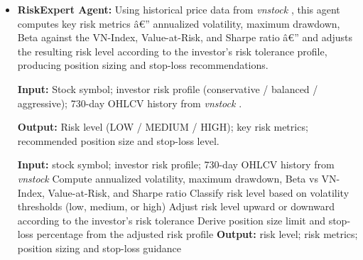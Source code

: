 \documentclass{ieeeaccess}
\begin{document}
\begin{itemize}
    \textbf{Input:} Stock symbol; financial ratios (P/E, P/B, EPS, dividend yield) and 730-day
    OHLCV data from \textit{vnstock} \cite{vnstock2023}.

    \textbf{Output:} Investment recommendation (BUY/HOLD/SELL); composite score (0--100);
    confidence level; per-dimension analysis breakdown.

    \begin{algorithmic}[1]
    \STATE \textbf{Input:} stock symbol; financial ratios and OHLCV history from \textit{vnstock}
    \STATE Fetch P/E, P/B, EPS, dividend yield, 52-week high/low, volume, and Beta
    \STATE Score each metric independently on a 0--100 scale based on predefined thresholds
    \STATE Combine scores with higher priority on financial health, followed equally by technical position and valuation
    \STATE Map composite score to recommendation: high scores yield BUY, low scores yield SELL, mid-range yields HOLD
    \STATE \textbf{Output:} recommendation; composite score; confidence level
    \end{algorithmic}


    \item \textbf{RiskExpert Agent:}
    Using historical price data from \textit{vnstock} \cite{vnstock2023}, this agent computes
    key risk metrics â€” annualized volatility, maximum drawdown, Beta against the VN-Index,
    Value-at-Risk, and Sharpe ratio â€” and adjusts the resulting risk level according to the
    investor's risk tolerance profile, producing position sizing and stop-loss recommendations.
    
    \textbf{Input:} Stock symbol; investor risk profile (conservative / balanced / aggressive);
    730-day OHLCV history from \textit{vnstock} \cite{vnstock2023}.

    \textbf{Output:} Risk level (LOW / MEDIUM / HIGH); key risk metrics; recommended position
    size and stop-loss level.

    \begin{algorithmic}[1]
    \STATE \textbf{Input:} stock symbol; investor risk profile; 730-day OHLCV history from \textit{vnstock}
    \STATE Compute annualized volatility, maximum drawdown, Beta vs VN-Index, Value-at-Risk, and Sharpe ratio
    \STATE Classify risk level based on volatility thresholds (low, medium, or high)
    \STATE Adjust risk level upward or downward according to the investor's risk tolerance
    \STATE Derive position size limit and stop-loss percentage from the adjusted risk profile
    \STATE \textbf{Output:} risk level; risk metrics; position sizing and stop-loss guidance
    \end{algorithmic}



\end{itemize}
\end{document}
